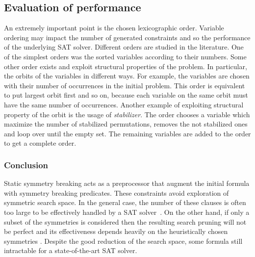 \subsection{Evaluation of performance}

An extremely important point is the chosen lexicographic order.
Variable ordering may impact the number of generated constraints and so the performance of
the underlying SAT solver. Different orders are studied in the literature. 
One of the simplest orders was the sorted variables according to their numbers.
Some other order exists and exploit structural properties of the 
problem. In particular, the orbits of the variables in different ways. For example, the variables are chosen 
with their number of occurrences in the initial problem. This order is equivalent to put largest orbit first
and so on, because each variable on the same orbit must have the same number of occurrences.
Another example of exploiting structural property of the orbit is the usage of \emph{stabilizer}.
The order chooses a variable which maximize the number of stabilized permutations, removes the not stabilized ones and loop over until the empty set. The remaining variables are added to the order to get a complete order.

%
%
%
%
%


\subsubsection{Conclusion}
Static symmetry breaking acts as a preprocessor that augment the initial formula with
symmetry breaking predicates. These constraints avoid exploration of symmetric search space.
In the general case, the number of these clauses is often too large to be
effectively handled by a SAT solver~\cite{Luks2004}. 
On the other hand, if only a subset of the symmetries is considered then the resulting search pruning
will not be perfect and its effectiveness depends heavily on the
heuristically chosen symmetries \cite{biere2009handbook}.
Despite the good reduction of the search space, some formula still intractable for a 
state-of-the-art SAT solver.

